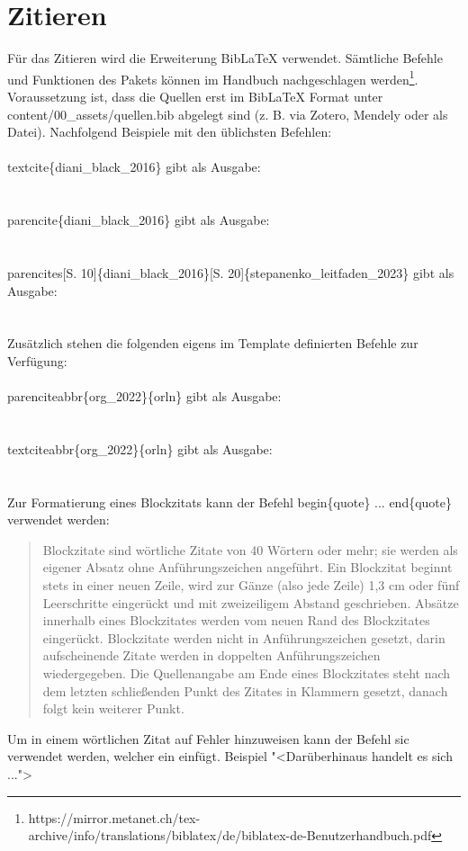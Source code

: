 \section{Zitieren}
Für das Zitieren wird die Erweiterung BibLaTeX verwendet. Sämtliche Befehle und Funktionen des Pakets können im Handbuch nachgeschlagen werden\footnote{https://mirror.metanet.ch/tex-archive/info/translations/biblatex/de/biblatex-de-Benutzerhandbuch.pdf}. Voraussetzung ist, dass die Quellen erst im BibLaTeX Format unter content/00\_assets/quellen.bib abgelegt sind (z. B. via Zotero, Mendely oder als Datei). Nachfolgend Beispiele mit den üblichsten Befehlen:\\
\\
\setminus textcite\{diani\_black\_2016\} gibt als Ausgabe:\\ 
\textcite{diani_black_2016}\\
\\
\setminus parencite\{diani\_black\_2016\} gibt als Ausgabe:\\ 
\parencite{diani_black_2016}\\
\\
\setminus parencites[S. 10]\{diani\_black\_2016\}[S. 20]\{stepanenko\_leitfaden\_2023\} gibt als Ausgabe:\\ 
\parencites[S. 10]{diani_black_2016}[S. 20]{stepanenko_leitfaden_2023}\\
\\
Zusätzlich stehen die folgenden eigens im Template definierten Befehle zur Verfügung:\\
\\
\setminus parenciteabbr\{org\_2022\}\{orln\} gibt als Ausgabe:\\ 
\\
\\
\setminus textciteabbr\{org\_2022\}\{orln\} gibt als Ausgabe:\\ 
\\
\\
Zur Formatierung eines Blockzitats kann der Befehl \setminus begin\{quote\} ... \setminus end\{quote\} verwendet werden:
\begin{quote}
Blockzitate sind wörtliche Zitate von 40 Wörtern oder mehr; sie werden als eigener Absatz ohne Anführungszeichen angeführt.
Ein Blockzitat beginnt stets in einer neuen Zeile, wird zur Gänze (also jede Zeile) 1,3 cm oder fünf Leerschritte eingerückt und mit zweizeiligem Abstand geschrieben. Absätze innerhalb eines Blockzitates werden vom neuen Rand des Blockzitates eingerückt. Blockzitate werden nicht in Anführungszeichen gesetzt, darin aufscheinende Zitate werden in doppelten Anführungszeichen wiedergegeben. Die Quellenangabe am Ende eines Blockzitates steht nach dem letzten schließenden Punkt des Zitates in Klammern gesetzt, danach folgt kein weiterer Punkt.\\
\parencite[S. 111]{psychologie_richtlinien_2016}
\end{quote}
\noindent
Um in einem wörtlichen Zitat auf Fehler hinzuweisen kann der Befehl \setminus sic verwendet werden, welcher ein \sic einfügt. Beispiel "<Darüberhinaus \sic handelt es sich ...">


